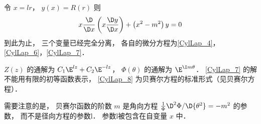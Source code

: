 令 $x = lr$，   $y\left( x \right) = R\left( r \right)$ 则
\begin{equation}\label{CylLap_8} 
x\frac{\D }{{\D x}}\left( {x\frac{{\D y}}{{\D x}}} \right) + \left( {{x^2} - {m^2}} \right)y = 0
\end{equation}
到此为止， 三个变量已经完全分离， 各自的微分方程为\autoref{CylLap_4}， \autoref{CylLap_6}，\autoref{CylLap_7}．

$Z\left( z \right)$ 的通解为 ${C_1}{\E^{lz}} + {C_2}{\E^{ - lz}}$，   $\Phi \left( \theta  \right)$ 的通解为 ${\E^{\I m\theta }}$．   \autoref{CylLap_7} 的解不能用有限的初等函数表示， \autoref{CylLap_8} 为贝赛尔方程的标准形式（见贝赛尔方程）．

需要注意的是， 贝赛尔函数的阶数 $m$ 是角向方程 $\frac{1}{\Phi }{{{\D^2}\Phi }}/{{\D{\theta ^2}}} =  - {m^2}$ 的参数， 而不是径向方程的参数l． 参数l被包含在自变量 $x$ 中．
 
